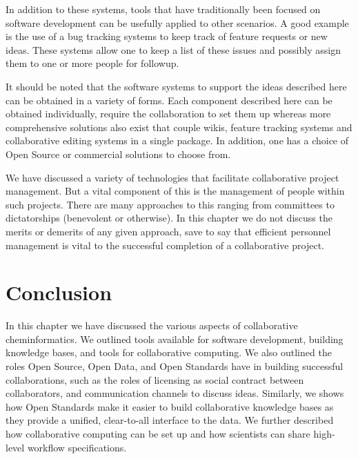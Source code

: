 \documentclass[11pt]{book}
\begin{document}
In addition to these systems, tools that have traditionally been
focused on software development can be usefully applied to other
scenarios. A good example is the use of a bug tracking systems to keep
track of feature requests or new ideas. These systems allow one to
keep a list of these issues and possibly assign them to one or more
people for followup.

It should be noted that the software systems to support the ideas
described here can be obtained in a variety of forms. Each component
described here can be obtained individually, require the collaboration
to set them up whereas more comprehensive solutions also exist that
couple wikis, feature tracking systems and collaborative editing
systems in a single package. In addition, one has a choice of Open
Source or commercial solutions to choose from.

We have discussed a variety of technologies that facilitate
collaborative project management. But a vital component of this is the
management of people within such projects. There are many approaches to
this ranging from committees to dictatorships (benevolent or
otherwise). In this chapter we do not discuss the merits or demerits
of any given approach, save to say that efficient personnel management
is vital to the successful completion of a collaborative project.

\section{Conclusion}

In this chapter we have discussed the various aspects of collaborative
cheminformatics. We outlined tools available for software development,
building knowledge bases, and tools for collaborative computing.
We also outlined the roles Open Source, Open Data, and Open Standards
have in building successful collaborations, such as the roles of
licensing as social contract between collaborators, and communication
channels to discuss ideas. Similarly, we shows how Open Standards
make it easier to build collaborative knowledge bases as they
provide a unified, clear-to-all interface to the data. We further
described how collaborative computing can be set up and how
scientists can share high-level workflow specifications.



\end{document}
